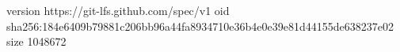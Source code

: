 version https://git-lfs.github.com/spec/v1
oid sha256:184e6409b79881c206bb96a44fa8934710e36b4e0e39e81d44155de638237e02
size 1048672
